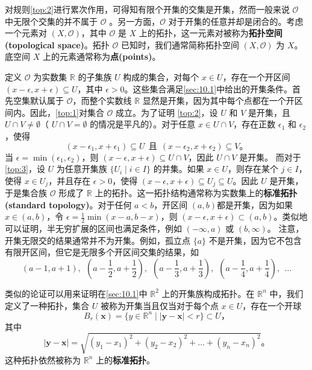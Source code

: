 	对规则\ref{top:2}进行累次作用，可得知有限个开集的交集是开集，然而一般来说 $\mathcal{O}$ 中无限个交集的并不属于 $\mathcal{O}$ 。另一方面，$\mathcal{O}$ 对于开集的任意并却是闭合的。考虑一个元素对 $(X,\mathcal{O} )$，其中 $\mathcal{O}$ 是 $X$ 上的拓扑，这一元素对被称为\textbf{拓扑空间(topological space)}。拓扑 $\mathcal{O}$ 已知时，我们通常简称拓扑空间 $(X,\mathcal{O} )$ 为 $X$。底空间 $X$ 上的元素通常称为\textbf{点(points)}。

\begin{eg}\label{eg:10.1}
 	定义 $\mathcal{O}$ 为实数集 $\mathbb{R}$ 的子集族 $U$ 构成的集合，对每个 $x\in U$，存在一个开区间 $(x-\epsilon ,x+\epsilon )\subseteq U$，其中 $\epsilon  >0$。这些集合满足\ref{sec:10.1}中给出的开集条件。首先空集默认属于 $\mathcal{O}$，而整个实数线 $\mathbb{R}$ 显然是开集，因为其中每个点都在一个开区间内。因此，\ref{top:1}对集合 $\mathcal{O}$ 成立。为了证明 \ref{top:2}，设 $U$ 和 $V$ 是开集，且 $U\cap V\neq \emptyset $（ $U\cap V=\emptyset $ 的情况是平凡的）。对于任意 $x\in U\cap V$，存在正数 $\epsilon _{1}$ 和 $\epsilon _{2}$，使得
\begin{equation*}
    (x-\epsilon _{1} ,x+\epsilon _{1} )\subseteq U\ \ \text{且} \ \ (x-\epsilon _{2} ,x+\epsilon _{2} )\subseteq V。
\end{equation*}
当 $\epsilon =\min (\epsilon _{1} ,\epsilon _{2} )$，则 $(x-\epsilon ,x+\epsilon )\subseteq U\cap V$，因此 $U\cap V$ 是开集。
	而对于\ref{top:3}，设 $U$ 为任意开集族 $\{U_{i} \mid i\in I\}$ 的并集。如果 $x\in U$，则存在某个 $j\in I$，使得 $x\in U_{j}$，并且存在 $\epsilon  >0$，使得 $(x-\epsilon ,x+\epsilon )\subseteq U_{j} \subseteq U$。因此 $U$ 是开集，于是集合族 $\mathcal{O}$ 形成了 $\mathbb{R}$ 上的拓扑。这一拓扑结构通常称为实数集上的\textbf{标准拓扑(standard topology)}。对于任何 $a< b$，开区间 $(a,b)$都是开集，因为如果 $x\in (a,b)$，令 $\epsilon =\frac{1}{2}\min (x-a,b-x)$，则 $(x-\epsilon ,x+\epsilon )\subset (a,b)$。类似地可以证明，半无穷扩展的区间也满足条件，例如 $(-\infty ,a)$ 或 $(b,\infty )$。
	注意，开集无限交的结果通常并不为开集。例如，孤立点 $\{a\}$ 不是开集，因为它不包含有限开区间，但它是无限多个开区间交集的结果，如
\begin{equation*}
    (a-1,a+1),\ \ (a-\frac{1}{2} ,a+\frac{1}{2} ),\ \ (a-\frac{1}{3} ,a+\frac{1}{3} ),\ \ (a-\frac{1}{4} ,a+\frac{1}{4} ),\ \ \dotsc 
\end{equation*}
\end{eg}
类似的论证可以用来证明在\ref{sec:10.1}中 $\mathbb{R}^{2}$ 上的开集族构成拓扑。在 $\mathbb{R}^{n}$ 中，我们定义了一种拓扑，集合 $U$ 被称为开集当且仅当对于每个点 $x\in U$，存在一个开球
\begin{equation*}
    B_{r} (\mathbf{x} )=\{y\in \mathbb{R}^{n} \mid | \mathbf{y} -\mathbf{x}| < r\}\subset U，
\end{equation*}
其中
\begin{equation*}
    |\mathbf{y} -\mathbf{x} |=\sqrt{(y_{1} -x_{1} )^{2} +(y_{2} -x_{2} )^{2} +\dotsc +(y_{n} -x_{n} )^{2}} 。
\end{equation*}
这种拓扑依然被称为 $\mathbb{R}^{n}$ 上的\textbf{标准拓扑}。	

